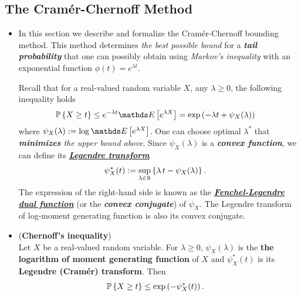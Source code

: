 \documentclass[11pt]{article}
\begin{document}
\subsection{The Cram\'er-Chernoff Method}
\begin{itemize}
\item \begin{remark}
In this section we describe and formalize the Cram{\'e}r-Chernoff bounding method. This method determines \emph{the best possible bound} for a \emph{\textbf{tail probability}} that one can possibly obtain using \emph{Markov's inequality} with an exponential function $\phi(t) = e^{\lambda t}$.

Recall that for a real-valued random variable $X$, any $\lambda \ge 0$, the following inequality holds
\begin{align*}
\bP\set{X \ge t} &\le e^{-\lambda t} \E{}{e^{\lambda X}} = \exp\paren{-\lambda t + \psi_{X}(\lambda) }
\end{align*} where $\psi_{X}(\lambda) := \log   \E{}{e^{\lambda X}}$. One can choose optimal $\lambda^{*}$ that \emph{\textbf{minimizes} the upper bound above}.
Since $\psi_{X}(\lambda)$ is a \emph{\textbf{convex function}}, we can define its \underline{\emph{\textbf{Legendre transform}}}
\begin{align*}
\psi^{*}_{X}(t) &:= \sup_{\lambda \in {\mathbb R}}\left\{\lambda\,t - \psi_{X}(\lambda)\right\}.
\end{align*} The expression of the right-hand side is known as the \underline{\emph{\textbf{Fenchel-Legendre dual function}}} (or the \textbf{\emph{convex conjugate}}) of $\psi_{X}$. The Legendre transform of log-moment generating function is also its convex conjugate. %
\end{remark}

\item \begin{proposition} (\textbf{Chernoff's inequality}) \citep{boucheron2013concentration}\\
Let $X$ be a real-valued random variable. For $\lambda \ge 0$,  $\psi_{X}(\lambda)$ is the \textbf{the logarithm of moment generating function} of $X$ and $\psi^{*}_{X}(t)$ is its \textbf{Legendre (Cram{\'e}r) transform}. Then 
\begin{align}
{\mathbb P}\left\{X \ge t\right\} &\le \exp\left(-\psi^{*}_{X}(t)\right). \label{ineqn: chernoff_inequality}
\end{align}
\end{proposition}


\end{itemize}
\end{document}
